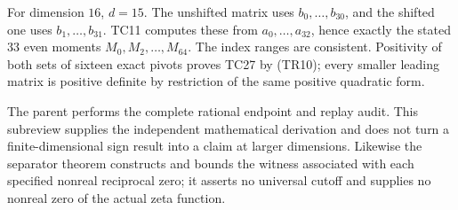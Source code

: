 For dimension \(16\), \(d=15\). The unshifted matrix uses \(b_0,\ldots,b_{30}\), and the shifted one uses \(b_1,\ldots,b_{31}\). TC11 computes these from \(a_0,\ldots,a_{32}\), hence exactly the stated \(33\) even moments \(M_0,M_2,\ldots,M_{64}\). The index ranges are consistent. Positivity of both sets of sixteen exact pivots proves TC27 by (TR10); every smaller leading matrix is positive definite by restriction of the same positive quadratic form.

The parent performs the complete rational endpoint and replay audit. This subreview supplies the independent mathematical derivation and does not turn a finite-dimensional sign result into a claim at larger dimensions. Likewise the separator theorem constructs and bounds the witness associated with each specified nonreal reciprocal zero; it asserts no universal cutoff and supplies no nonreal zero of the actual zeta function.
